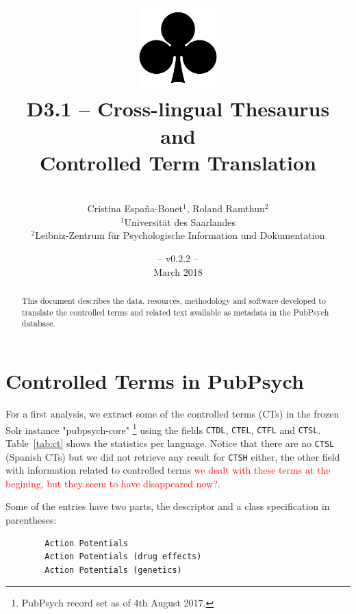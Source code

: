 \documentclass[a4paper,11pt]{article}
\title{
	\includegraphics[width=3cm]{./img/200px-SuitClubs.png} \\
	\Huge D3.1 -- Cross-lingual Thesaurus and \\ Controlled Term Translation \\ 
}
\author{\vspace*{1cm}\\ \LARGE Cristina Espa\~na-Bonet$^{1}$, Roland Ramthun$^{2}$ \medskip \\ 
	\Large $^{1}$Universit\"at des Saarlandes\\ \Large $^{2}$Leibniz-Zentrum für Psychologische Information und Dokumentation}
\date{\vspace*{2cm} -- v0.2.2 --\\March 2018}
\newcommand{\red}[1]{\textcolor{red}{#1}}
\begin{document}
	
	\clearpage\maketitle
	\thispagestyle{empty}
	
	\vspace*{5cm}
	\begin{abstract}
		This document describes the data, resources, methodology and software developed to translate the controlled terms and related text available as metadata in the PubPsych database.
	\end{abstract}
	
	\newpage
	\tableofcontents
	\clearpage
	
	
	
	\section{Controlled Terms in PubPsych}
	\label{s:ct}
	
	For a first analysis, we extract some of the controlled terms (CTs) in the frozen Solr instance "pubpsych-core"%
	\footnote{PubPsych record set as of 4th August 2017.}  using the fields {\tt CTDL}, {\tt CTEL}, {\tt CTFL} and {\tt CTSL}. Table~\ref{tab:ct} shows the statistics per language. Notice that there are no {\tt CTSL} (Spanish CTs) but we did not retrieve any result for {\tt CTSH} either, the other field with information related to controlled terms \red{we dealt with these terms at the begining, but they seem to have disappeared now?}.
	
	
	Some of the entries have two parts, the descriptor and a class specification in parentheses:
	{\small 
		\begin{verbatim}
		Action Potentials
		Action Potentials (drug effects)
		Action Potentials (genetics)
		\end{verbatim}
	}
	
\end{document}
